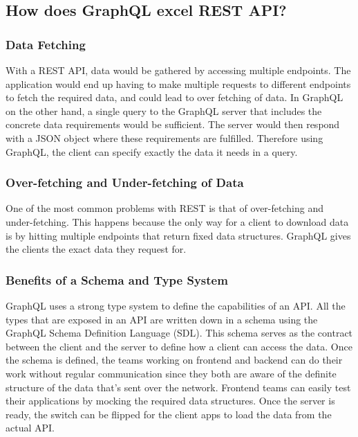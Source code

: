 \subsection{How does GraphQL excel REST API?}

\subsubsection{Data Fetching}

With a REST API, data would be gathered by accessing multiple endpoints. The application would  
end up having to make multiple requests to different endpoints to fetch the required data, and could lead to over fetching of data.
In GraphQL on the other hand, a single query to the GraphQL server that includes the concrete data requirements would be sufficient. The server would then respond with a JSON object where these requirements are fulfilled. Therefore using GraphQL, the client can specify exactly the data it needs in a query.

\subsubsection{Over-fetching and Under-fetching of Data}

One of the most common problems with REST is that of over-fetching and under-fetching. This happens because the only way for a client to download data is by hitting multiple endpoints that return fixed data structures.
GraphQL gives the clients the exact data they request for.

\subsubsection{Benefits of a Schema and Type System}

GraphQL uses a strong type system to define the capabilities of an API. All the types that are exposed in an API 
are written down in a schema using the GraphQL Schema Definition Language (SDL). This schema serves as the contract between the client and the server to define how a client can access the data.
Once the schema is defined, the teams working on frontend and backend can do their work without regular communication 
since they both are aware of the definite structure of the data that’s sent over the network.
Frontend teams can easily test their applications by mocking the required data structures. Once the server is ready, 
the switch can be flipped for the client apps to load the data from the actual API.


